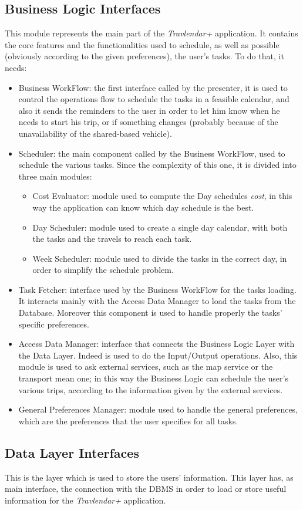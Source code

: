\subsection*{Business Logic Interfaces}
This module represents the main part of the \emph{Travlendar+} application. It contains the core features and the functionalities used to schedule, as well as possible (obviously according to the given preferences), the user's tasks. To do that, it needs:
\begin{itemize}
    \item Business WorkFlow: the first interface called by the presenter, it is used to control the operations flow to schedule the tasks in a feasible calendar, and also it sends the reminders to the user in order to let him know when he needs to start his trip, or if something changes (probably because of the unavailability of the shared-based vehicle).
    \item Scheduler: the main component called by the Business WorkFlow, used to schedule the various tasks. Since the complexity of this one, it is divided into three main modules:
    
    \begin{itemize}
        \item Cost Evaluator: module used to compute the Day schedules \emph{cost}, in this way the application can know which day schedule is the best.
        \item Day Scheduler: module used to create a single day calendar, with both the tasks and the travels to reach each task.
        \item Week Scheduler: module used to divide the tasks in the correct day, in order to simplify the schedule problem.
    \end{itemize}
    
    \item Task Fetcher: interface used by the Business WorkFlow for the tasks loading. It interacts mainly with the Access Data Manager to load the tasks from the Database. Moreover this component is used to handle properly the tasks' specific preferences.
    
    \item Access Data Manager: interface that connects the Business Logic Layer with the Data Layer. Indeed is used to do the Input/Output operations. Also, this module is used to ask external services, such as the map service or the transport mean one; in this way the Business Logic can schedule the user's various trips, according to the information given by the external services.
    
    \item General Preferences Manager: module used to handle the general preferences, which are the preferences that the user specifies for all tasks.
    
\end{itemize}

\subsection*{Data Layer Interfaces}
This is the layer which is used to store the users' information. This layer has, as main interface, the connection with the DBMS in order to load or store useful information for the \emph{Travlendar+} application.